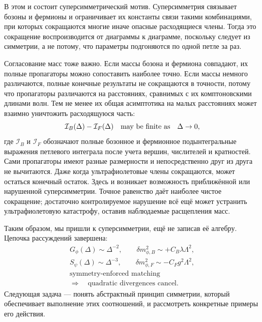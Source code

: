 В этом и состоит суперсимметрический мотив. Суперсимметрия связывает бозоны и фермионы и ограничивает их константы связи такими комбинациями, при которых сокращаются многие иначе опасные расходящиеся члены. Тогда это сокращение воспроизводится от диаграммы к диаграмме, поскольку следует из симметрии, а не потому, что параметры подгоняются по одной петле за раз.

Согласование масс тоже важно. Если массы бозона и фермиона совпадают, их полные пропагаторы можно сопоставить наиболее точно. Если массы немного различаются, полные конечные результаты не сокращаются в точности, потому что пропагаторы различаются на расстояниях, сравнимых с их комптоновскими длинами волн. Тем не менее их общая асимптотика на малых расстояниях может взаимно уничтожить расходящуюся часть:
\begin{equation}
\mathcal I_B(\Delta)-\mathcal I_F(\Delta)
\quad\hbox{may be finite as}\quad \Delta\to0,
\end{equation}
где \(\mathcal I_B\) и \(\mathcal I_F\) обозначают полные бозонное и фермионное подынтегральные выражения петлевого интеграла после учета вершин, числителей и кратностей. Сами пропагаторы имеют разные размерности и непосредственно друг из друга не вычитаются. Даже когда ультрафиолетовые члены сокращаются, может остаться конечный остаток. Здесь и возникает возможность приближённой или нарушенной суперсимметрии. Точное равенство даёт наиболее чистое сокращение; достаточно контролируемое нарушение всё ещё может устранить ультрафиолетовую катастрофу, оставив наблюдаемые расщепления масс.

Таким образом, мы пришли к суперсимметрии, ещё не записав её алгебру. Цепочка рассуждений завершена:
\begin{equation}
\begin{gathered}
G_\phi(\Delta)\sim \Delta^{-2},
\qquad
\delta m_{\phi,B}^2\sim+C_B\lambda\Lambda^2,\\[0.4em]
S_\psi(\Delta)\sim \Delta^{-3},
\qquad
\delta m_{\phi,F}^2\sim-C_Fg^2\Lambda^2,\\[0.4em]
\text{symmetry-enforced matching}\\
\Longrightarrow\quad
\text{quadratic divergences cancel}.
\end{gathered}
\end{equation}
Следующая задача — понять абстрактный принцип симметрии, который обеспечивает выполнение этих соотношений, и рассмотреть конкретные примеры его действия.